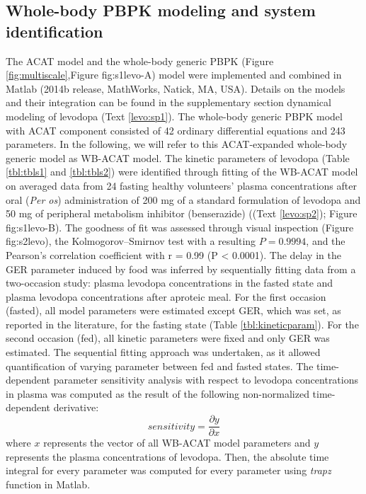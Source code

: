 \subsection{Whole-body PBPK modeling and system identification}
The ACAT model\cite{agoram2001predicting} and the whole-body generic PBPK \cite{jones2013basic} (Figure \ref{fig:multiscale},Figure {fig:s1levo}-A) model were implemented and combined in Matlab (2014b release, MathWorks, Natick, MA, USA). Details on the models and their integration can be found in the supplementary section dynamical modeling of levodopa (Text \ref{levo:sp1}). The whole-body generic PBPK model with ACAT component consisted of 42 ordinary differential equations and 243 parameters. In the following, we will refer to this ACAT-expanded whole-body generic model as WB-ACAT model.
The kinetic parameters of levodopa (Table \ref{tbl:tbls1} and \ref{tbl:tbls2}) were identified through fitting of the WB-ACAT model on averaged data from 24 fasting healthy volunteers' plasma concentrations after oral (\textit{Per os}) administration of 200 mg of a standard formulation of levodopa and 50 mg of peripheral metabolism inhibitor (benserazide) \cite{keller2011comparative} ((Text \ref{levo:sp2}); Figure {fig:s1levo}-B). The goodness of fit was assessed through visual inspection (Figure {fig:s2levo}), the Kolmogorov–Smirnov test \cite{massey1951kolmogorov} with a resulting $P = 0.9994$, and the Pearson’s correlation coefficient with r = 0.99 (P < 0.0001).
The delay in the GER parameter induced by food was inferred by sequentially fitting data from a two-occasion study\cite{contin2010pharmacokinetics}: plasma levodopa concentrations in the fasted state and plasma levodopa concentrations after aproteic meal. For the first occasion (fasted), all model parameters were estimated except GER, which was set, as reported in the literature, for the fasting state (Table \ref{tbl:kineticparam}). For the second occasion (fed), all kinetic parameters were fixed and only GER was estimated. The sequential fitting approach was undertaken, as it allowed quantification of varying parameter between fed and fasted states.
The time-dependent parameter sensitivity analysis with respect to levodopa concentrations in plasma was computed as the result of the following non-normalized time-dependent derivative:\\
\begin{equation}
sensitivity =\frac{\partial y}{\partial x}
\end{equation}
where $x$ represents the vector of all WB-ACAT model parameters and $y$ represents the plasma concentrations of levodopa. Then, the absolute time integral for every parameter was computed for every parameter using \textit{trapz} function in Matlab.
